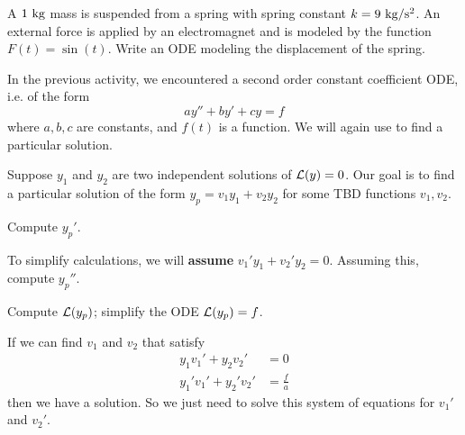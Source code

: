 
\begin{applicationActivities}


\begin{activity}{10}
A \(1\ {\rm kg}\) mass is suspended from a spring with spring constant \(k= 9\ {\rm kg/s^2}\).  An external force is applied by an electromagnet and is modeled by the function \(F(t)=\sin(t)\).  Write an ODE modeling the displacement of the spring.
\end{activity}

\begin{observation}
In the previous activity, we encountered a  second order constant coefficient ODE, i.e. of the form
\[ay''+by'+cy=f\]
where \(a,b,c\) are constants, and \(f(t)\) is a function.
\vfill
We will again use  to find a particular solution.
\vfill
\end{observation}

\begin{activity}{15}
Suppose \(y_1\) and \(y_2\) are two independent solutions of \(\mathcal{L}(y)=0\).  
\vfill
Our goal is to find a particular solution of the form \(y_p = v_1 y_1 + v_2 y_2\) for some TBD functions \(v_1,v_2\).
\vfill
\begin{subactivity}
Compute \(y_p'\).
\end{subactivity}

\begin{subactivity} To simplify calculations, we will \textbf{assume} \(v_1'y_1+v_2'y_2=0\).  Assuming this, compute \(y_p''\).
\end{subactivity}

\begin{subactivity}
Compute \(\mathcal{L}(y_p)\); simplify the ODE \(\mathcal{L}(y_p)=f\).
\end{subactivity}
\vfill
\end{activity}

\begin{observation}
If we can find \(v_1\) and \(v_2\) that satisfy
\begin{alignat*}{2}
y_1 v_1' + y_2 v_2'&=0 \\
y_1' v_1' + y_2' v_2'&=\frac{f}{a} 
\end{alignat*}
then we have a solution.  So we just need to solve this system of equations for \(v_1'\) and \(v_2'\).


\end{observation}
\end{applicationActivities}
